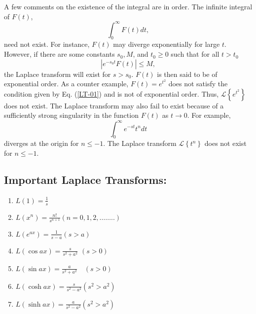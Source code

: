 A few comments on the existence of the integral are in order. The infinite integral of $F(t)$,
\begin{equation*}
\int_{0}^{\infty} F(t) d t,
\end{equation*}
need not exist. For instance, $F(t)$ may diverge exponentially for large $t$. However, if there are some constants $s_{0}, M$, and $t_{0} \geq 0$ such that for all $t>t_{0}$
\begin{equation}
\left|e^{-s_{0} t} F(t)\right| \leq M,\label{LT-01}
\end{equation}
the Laplace transform will exist for $s>s_{0} $. $F(t)$ is then said to be of exponential order. As a counter example, $F(t)=e^{t^{2}}$ does not satisfy the condition given by Eq. (\ref{LT-01}) and is not of exponential order. Thus, $\mathcal{L}\left\{e^{t^{2}}\right\}$ does not exist.
The Laplace transform may also fail to exist because of a sufficiently strong singularity in the function $F(t)$ as $t \rightarrow 0$. For example,
\begin{equation*}
\int_{0}^{\infty} e^{-s t} t^{n} d t
\end{equation*}
diverges at the origin for $n \leq-1$. The Laplace transform $\mathcal{L}\left\{t^{n}\right\}$ does not exist for $n \leq-1$. 

\subsection{Important Laplace Transforms:}
\begin{enumerate}
	\item $L(1)=\frac{1}{s}$
	\item $L\left(x^{n}\right)=\frac{n !}{s^{n+1}}(n=0,1,2, \ldots \ldots . .)$
	\item $L\left(e^{a x}\right)=\frac{1}{s-a}(s>a)$
	\item $L(\cos a x)=\frac{s}{s^{2}+a^{2}}$
	$(s>0)$
	\item $L(\sin a x)=\frac{a}{s^{2}+a^{2}} \quad(s>0)$
	\item $L(\cosh a x)=\frac{s}{s^{2}-a^{2}}\left(s^{2}>a^{2}\right)$
	\item $L(\sinh a x)=\frac{a}{s^{2}-a^{2}}\left(s^{2}>a^{2}\right)$
\end{enumerate}

